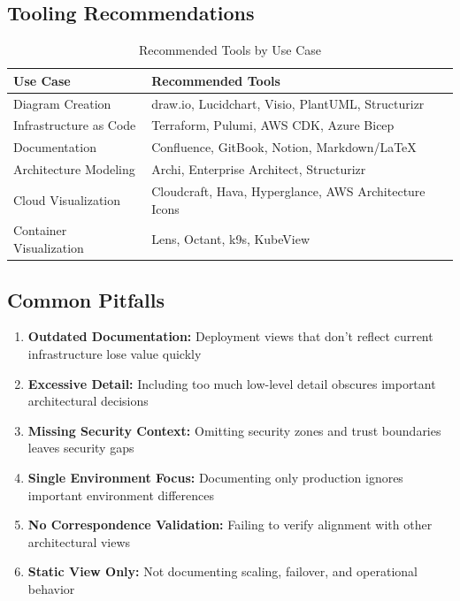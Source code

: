 \documentclass[11pt,letterpaper]{article}
\begin{document}
\subsection{Tooling Recommendations}

\begin{table}[H]
\centering
\caption{Recommended Tools by Use Case}
\small
\begin{tabular}{@{}L{4cm}L{9.5cm}@{}}
\toprule
\textbf{Use Case} & \textbf{Recommended Tools} \\
\midrule
Diagram Creation & draw.io, Lucidchart, Visio, PlantUML, Structurizr \\
Infrastructure as Code & Terraform, Pulumi, AWS CDK, Azure Bicep \\
Documentation & Confluence, GitBook, Notion, Markdown/LaTeX \\
Architecture Modeling & Archi, Enterprise Architect, Structurizr \\
Cloud Visualization & Cloudcraft, Hava, Hyperglance, AWS Architecture Icons \\
Container Visualization & Lens, Octant, k9s, KubeView \\
\bottomrule
\end{tabular}
\end{table}

\subsection{Common Pitfalls}

\begin{warningbox}
\begin{enumerate}[nosep]
    \item \textbf{Outdated Documentation:} Deployment views that don't reflect current infrastructure lose value quickly
    \item \textbf{Excessive Detail:} Including too much low-level detail obscures important architectural decisions
    \item \textbf{Missing Security Context:} Omitting security zones and trust boundaries leaves security gaps
    \item \textbf{Single Environment Focus:} Documenting only production ignores important environment differences
    \item \textbf{No Correspondence Validation:} Failing to verify alignment with other architectural views
    \item \textbf{Static View Only:} Not documenting scaling, failover, and operational behavior
\end{enumerate}
\end{warningbox}
\end{document}
